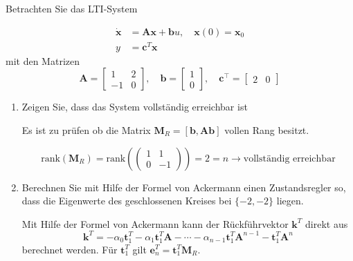 \documentclass[crop=false]{standalone}
\begin{document}
\begin{task}
Betrachten Sie das LTI-System

$$ 
\begin{aligned} \dot{\mathbf{x}} &=\mathbf{A x}+\mathbf{b} u, \quad \mathbf{x}(0)=\mathbf{x}_{0} \\ y &=\mathbf{c}^{T} \mathbf{x} \end{aligned}
 $$
mit den Matrizen
 $$ 
\mathbf{A}=\left[\begin{array}{cc}{1} & {2} \\ {-1} & {0}\end{array}\right], \quad \mathbf{b}=\left[\begin{array}{l}{1} \\ {0}\end{array}\right], \quad \mathbf{c}^{\top}=\left[\begin{array}{ll}{2} & {0}\end{array}\right]
 $$
 \begin{enumerate}[i]
  \item Zeigen Sie, dass das System vollständig erreichbar ist
\begin{solution}
Es ist zu prüfen ob die Matrix $\mathbf{M}_R = \left[\mathbf{b}, \mathbf{Ab} \right]$ vollen Rang besitzt.

\[ \text{rank}\left(\mathbf{M}_R\right) = \text{rank}\left(\begin{pmatrix} 1 & 1 \\ 0 & -1 \end{pmatrix}\right)=2=n \rightarrow \text{vollständig erreichbar}\]
\end{solution}
  \item Berechnen Sie mit Hilfe der Formel von Ackermann einen Zustandsregler so, dass
die Eigenwerte des geschlossenen Kreises bei $\{-2,-2\}$ liegen.
\begin{solution}
Mit Hilfe der Formel von Ackermann kann der Rückführvektor $\mathbf{k}^{T}$ direkt aus
\[ 
\mathbf{k}^{T}=-\alpha_{0} \mathbf{t}_{1}^{T}-\alpha_{1} \mathbf{t}_{1}^{T} \mathbf{A}-\cdots-\alpha_{n-1} \mathbf{t}_{1}^{T} \mathbf{A}^{n-1}-\mathbf{t}_{1}^{T} \mathbf{A}^{n}
 \]
 berechnet werden. Für $\mathbf{t}_{1}^{T}$ gilt $\mathbf{e}_{n}^{T}=\mathbf{t}_{1}^{T} \mathbf{M}_{R}$.
 

\end{solution}
\end{enumerate}
\end{task}
\end{document}
